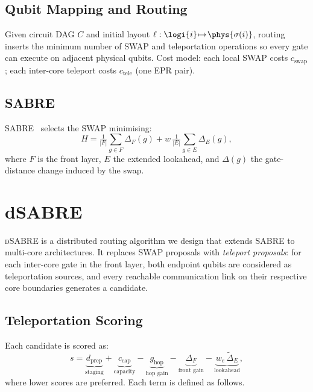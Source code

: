 \documentclass[conference]{IEEEtran}
\newcommand{\dSABRE}{\textsc{dSABRE}}
\newcommand{\SABRE}{\textsc{SABRE}}
\begin{document}
\subsection{Qubit Mapping and Routing}

Given circuit DAG $C$ and initial layout $\ell:\logi{i}\!\mapsto\!\phys{\sigma(i)}$,
routing inserts the minimum number of SWAP and teleportation operations so every
gate can execute on adjacent physical qubits.
Cost model: each local SWAP costs $c_{\mathrm{swap}}$; each inter-core
teleport costs $c_{\mathrm{tele}}$ (one EPR pair).

\subsection{SABRE}

\SABRE{}~\cite{li2019tackling} selects the SWAP minimising:
\begin{equation}
  H = \tfrac{1}{|F|}\!\sum_{g\in F}\!\Delta_F(g)
    + w\,\tfrac{1}{|E|}\!\sum_{g\in E}\!\Delta_E(g),
  \label{eq:sabre}
\end{equation}
where $F$ is the front layer, $E$ the extended lookahead, and $\Delta(g)$ the
gate-distance change induced by the swap.

\section{dSABRE}
\label{sec:dsabre}

\dSABRE{} is a distributed routing algorithm we design that extends \SABRE{} to
multi-core architectures.
It replaces SWAP proposals with \emph{teleport proposals}: for each inter-core
gate in the front layer, both endpoint qubits are considered as teleportation
sources, and every reachable communication link on their respective core
boundaries generates a candidate.

\subsection{Teleportation Scoring}

Each candidate is scored as:
\begin{equation}
  s = \underbrace{d_{\mathrm{prep}}}_{\text{staging}} +
      \underbrace{c_{\mathrm{cap}}}_{\text{capacity}} -
      \underbrace{g_{\mathrm{hop}}}_{\text{hop gain}} -
      \underbrace{\Delta_F}_{\text{front gain}} -
      \underbrace{w_e\,\tilde{\Delta}_E}_{\text{lookahead}},
  \label{eq:dsabre}
\end{equation}
where lower scores are preferred.  Each term is defined as follows.
\end{document}
